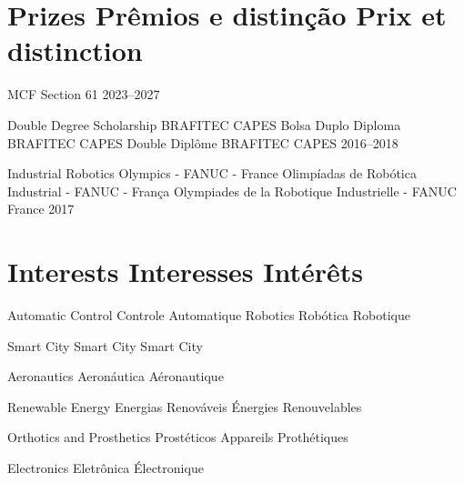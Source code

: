 \section{
  \ml
  {Prizes}
  {Prêmios e distinção}
  {Prix et distinction}
}

{
  MCF Section 61 2023--2027
}

{
  \ml
  {Double Degree Scholarship BRAFITEC CAPES}
  {Bolsa Duplo Diploma BRAFITEC CAPES}
  {Double Diplôme BRAFITEC CAPES} 2016--2018
}

{
  \ml
  {Industrial Robotics Olympics - FANUC - France}
  {Olimpíadas de Robótica Industrial - FANUC - França}
  {Olympiades de la Robotique Industrielle - FANUC France} 2017
}

\section{
  \ml
  {Interests}
  {Interesses}
  {Intérêts}
}

\renewcommand{\listitemsymbol}{-~} %
\cvlistdoubleitem
{
  \ml
  {Automatic Control}
  {Controle}
  {Automatique}
}
{
  \ml
  {Robotics}
  {Robótica}
  {Robotique}
}


{
    \ml
  {Smart City}
  {Smart City}
  {Smart City}
}

{
  \ml
  {Aeronautics}
  {Aeronáutica}
  {Aéronautique}
}

{
  \ml
  {Renewable Energy}
  {Energias Renováveis}
  {Énergies Renouvelables}
}


{
  \ml
  {Orthotics and Prosthetics}
  {Prostéticos}
  {Appareils Prothétiques}
}

{
  \ml
  {Electronics}
  {Eletrônica}
  {Électronique}
}

